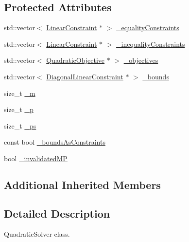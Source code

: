 \subsection*{Protected Attributes}
\begin{DoxyCompactItemize}
\item 
std\+::vector$<$ \hyperlink{namespaceocra_ae8b87cf4099be3efc3b410019ad2046e}{Linear\+Constraint} $\ast$ $>$ \hyperlink{classocra_1_1QuadraticSolver_a0068a59d185c9556a0179dae5c5a2ff4}{\+\_\+equality\+Constraints}
\item 
std\+::vector$<$ \hyperlink{namespaceocra_ae8b87cf4099be3efc3b410019ad2046e}{Linear\+Constraint} $\ast$ $>$ \hyperlink{classocra_1_1QuadraticSolver_af8ca3b3596faeedf97437b9b7d85a7f3}{\+\_\+inequality\+Constraints}
\item 
std\+::vector$<$ \hyperlink{namespaceocra_a0b50673710f087c0f1733aefd1a8e0f7}{Quadratic\+Objective} $\ast$ $>$ \hyperlink{classocra_1_1QuadraticSolver_a5c5ba942644eceb02326095343a642cb}{\+\_\+objectives}
\item 
std\+::vector$<$ \hyperlink{namespaceocra_ab310e2c53f5e52ec3aba0a832f7dc79e}{Diagonal\+Linear\+Constraint} $\ast$ $>$ \hyperlink{classocra_1_1QuadraticSolver_a5d2a0ca5a490f8c210780f281f0961e3}{\+\_\+bounds}
\item 
size\+\_\+t \hyperlink{classocra_1_1QuadraticSolver_a7138115950652cc14b22ca87d8fc8b64}{\+\_\+m}
\item 
size\+\_\+t \hyperlink{classocra_1_1QuadraticSolver_aee2e8409ab5338029910a78e2e196cd3}{\+\_\+p}
\item 
size\+\_\+t \hyperlink{classocra_1_1QuadraticSolver_a8818ed9913cda8253fd181e46e963f58}{\+\_\+ps}
\item 
const bool \hyperlink{classocra_1_1QuadraticSolver_aad4e1bd8a751c4e827d5a637b1c2e9fb}{\+\_\+bounds\+As\+Constraints}
\item 
bool \hyperlink{classocra_1_1QuadraticSolver_aadb395a0722e77c9ea19ed8968916c0e}{\+\_\+invalidated\+MP}
\end{DoxyCompactItemize}
\subsection*{Additional Inherited Members}


\subsection{Detailed Description}
Quadratic\+Solver class. 

